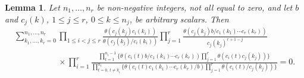 \documentclass[11pt]{article}
\numberwithin{equation}{section}
\newtheorem{Lemma}[Theorem]{Lemma}
 { \theoremstyle{definition}
\newtheorem{Definition}[Theorem]{Definition}
\newtheorem{Remark}[Theorem]{Remark} }
\begin{document}
\begin{Lemma}\label{cfg}
Let $n_1,\dots,n_r$ be non-negative integers, not all equal to zero,
and let $b$ and
$c_j(k)$, $1\leq j\leq r$, $0\leq k\leq n_j$, be arbitrary scalars.
Then
\begin{gather*}
\sum_{k_1,\dots,k_r=0}^{n_1,\dots,n_r}
\prod\limits_{1\leq i<j\leq r}\frac{\theta(c_j(k_j)c_i(k_i))}{\theta(c_j(k_j)/c_i(k_i))}
\prod\limits_{j=1}^r\frac{\theta(c_j(k_j)b/c_1(k_1)\dotsm c_r(k_r))}{c_j(k_j)^{r+1-j}}
\\ \phantom{\sum_{k_1,\dots,k_r=0}^{n_1,\dots,n_r}}
\times\prod\limits_{i=1}^r\frac{\prod\limits_{t=1}^{n_i-1}
\bigg\{\theta(c_i(t)b/c_1(k_1)\dotsm
 c_r(k_r))\prod\limits_{j=1}^r\theta(c_i(t)c_j(k_j))\bigg\}}
{\prod\limits_{t=0,\,t\neq k_i}^{n_i}
\bigg\{\theta(c_i(t)c_1(k_1)\dotsm c_r(k_r)/b)
\prod\limits_{j=1}^r\theta(c_i(t)/c_j(k_j))\bigg\}}=0.
\end{gather*}
\end{Lemma}
\end{document}
